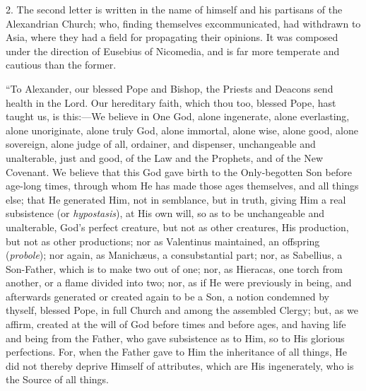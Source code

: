 2. The second letter is written in the name of himself and his
partisans of the Alexandrian Church; who, finding themselves
excommunicated, had withdrawn to Asia, where they had a field for
propagating their opinions. It was composed under the direction of
Eusebius of Nicomedia, and is far more temperate and cautious than the
former.

``To Alexander, our blessed Pope and Bishop, the Priests and
Deacons send health in the Lord. Our hereditary faith, which thou too,
blessed Pope, hast taught us, is this:—We believe in One God, alone
ingenerate, alone everlasting, alone unoriginate, alone truly God,
alone immortal, alone wise, alone good, alone sovereign, alone judge
of all, ordainer, and dispenser, unchangeable and unalterable, just
and good, of the Law and the Prophets, and of the New Covenant. We
believe that this God gave birth to the Only-begotten Son before
age-long times, through whom He has made those ages themselves, and
all things else; that He generated Him, not in semblance, but in
truth, giving Him a real subsistence (or \emph{hypostasis}), at His
own will, so as to be unchangeable and unalterable, God's perfect
creature, but not as other creatures, His production, but not as other
productions; nor as Valentinus maintained, an offspring (\emph{probole});
nor again, as Manichæus, a consubstantial part; nor, as Sabellius, a
Son-Father, which is to make two out of one; nor, as Hieracas, one
torch from another, or a flame divided into two; nor, as if He were
previously in being, and afterwards generated or created again to be a
Son, a notion condemned by thyself, blessed Pope, in full Church and
among the assembled Clergy; but, as we affirm, created at the will of
God before times and before ages, and having life and being from the
Father, who gave subsistence as to Him, so to His glorious
perfections. For, when the Father gave to Him the inheritance of all
things, He did not thereby deprive Himself of attributes, which are
His ingenerately, who is the Source of all things.

